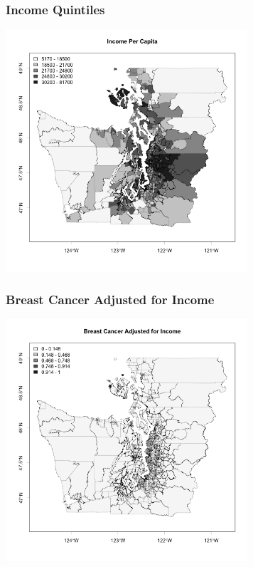\documentclass[handout]{beamer}
\begin{document}
\begin{frame}[fragile]
\frametitle{Income Quintiles}
\begin{center}
\includegraphics[width=9cm]{figure/income.png}
\end{center}
\end{frame}


\begin{frame}[fragile]
\frametitle{Breast Cancer Adjusted for Income}
\begin{center}
\includegraphics[width=9cm]{figure/breast_new.png}
\end{center}
\end{frame}
\end{document}
